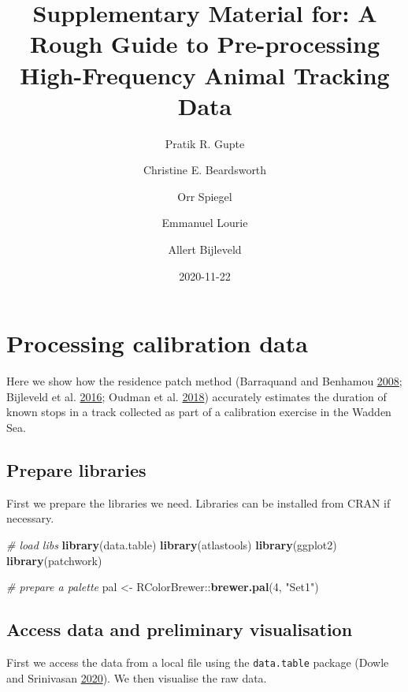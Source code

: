 \documentclass[]{scrartcl}
\title{Supplementary Material for: A Rough Guide to Pre-processing High-Frequency Animal Tracking Data}
\author{Pratik R. Gupte \and Christine E. Beardsworth \and Orr Spiegel \and Emmanuel Lourie \and Allert Bijleveld}
\date{2020-11-22}
\newenvironment{Shaded}{}{}
\newcommand{\CommentTok}[1]{\textcolor[rgb]{0.38,0.63,0.69}{\textit{#1}}}
\newcommand{\DecValTok}[1]{\textcolor[rgb]{0.25,0.63,0.44}{#1}}
\newcommand{\KeywordTok}[1]{\textcolor[rgb]{0.00,0.44,0.13}{\textbf{#1}}}
\newcommand{\NormalTok}[1]{#1}
\newcommand{\OperatorTok}[1]{\textcolor[rgb]{0.40,0.40,0.40}{#1}}
\newcommand{\StringTok}[1]{\textcolor[rgb]{0.25,0.44,0.63}{#1}}
\begin{document}
\maketitle

{
\setcounter{tocdepth}{2}
\tableofcontents
}
\hypertarget{processing-calibration-data}{%
\section{Processing calibration data}\label{processing-calibration-data}}

Here we show how the residence patch method (Barraquand and Benhamou \protect\hyperlink{ref-barraquand2008}{2008}; Bijleveld et al. \protect\hyperlink{ref-bijleveld2016}{2016}; Oudman et al. \protect\hyperlink{ref-oudman2018}{2018}) accurately estimates the duration of known stops in a track collected as part of a calibration exercise in the Wadden Sea.

\hypertarget{prepare-libraries}{%
\subsection{Prepare libraries}\label{prepare-libraries}}

First we prepare the libraries we need. Libraries can be installed from CRAN if necessary.

\begin{Shaded}
\begin{Highlighting}[]
\CommentTok{# load libs}
\KeywordTok{library}\NormalTok{(data.table)}
\KeywordTok{library}\NormalTok{(atlastools)}
\KeywordTok{library}\NormalTok{(ggplot2)}
\KeywordTok{library}\NormalTok{(patchwork)}

\CommentTok{# prepare a palette}
\NormalTok{pal <-}\StringTok{ }\NormalTok{RColorBrewer}\OperatorTok{::}\KeywordTok{brewer.pal}\NormalTok{(}\DecValTok{4}\NormalTok{, }\StringTok{"Set1"}\NormalTok{)}
\end{Highlighting}
\end{Shaded}

\hypertarget{access-data-and-preliminary-visualisation}{%
\subsection{Access data and preliminary visualisation}\label{access-data-and-preliminary-visualisation}}

First we access the data from a local file using the \texttt{data.table} package (Dowle and Srinivasan \protect\hyperlink{ref-dowle2020}{2020}).
We then visualise the raw data.
\end{document}
